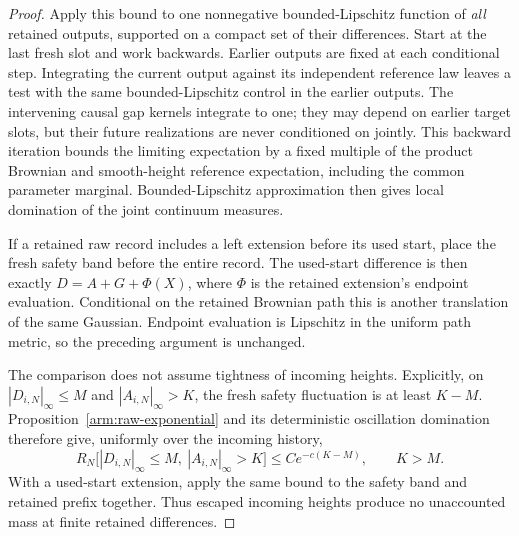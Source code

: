 \begin{proof}
Apply this bound to one nonnegative bounded-Lipschitz function of
\emph{all} retained outputs, supported on a compact set of their
differences.  Start at the last fresh slot and work backwards.
Earlier outputs are fixed at each conditional step.  Integrating the
current output against its independent reference law leaves a test
with the same bounded-Lipschitz control in the earlier outputs.
The intervening causal gap kernels integrate to one; they may depend
on earlier target slots, but their future realizations are never
conditioned on jointly.  This backward iteration bounds the limiting
expectation by a fixed multiple of the product Brownian and
smooth-height reference expectation, including the common parameter
marginal.  Bounded-Lipschitz approximation then gives local domination
of the joint continuum measures.

If a retained raw record includes a left extension before its used
start, place the fresh safety band before the entire record.  The
used-start difference is then exactly
$D=A+G+\Phi(X)$, where $\Phi$ is the retained extension's endpoint
evaluation.  Conditional on the retained Brownian path this is another
translation of the same Gaussian.  Endpoint evaluation is Lipschitz
in the uniform path metric, so the preceding argument is unchanged.

The comparison does not assume tightness of incoming heights.
Explicitly, on $|D_{i,N}|_\infty\le M$ and
$|A_{i,N}|_\infty>K$, the fresh safety fluctuation is at least $K-M$.
Proposition~\ref{arm:raw-exponential} and its deterministic oscillation
domination therefore give, uniformly over the incoming history,
\[
 R_N\bigl[|D_{i,N}|_\infty\le M,\
              |A_{i,N}|_\infty>K\bigr]
 \le C e^{-c(K-M)},\qquad K>M.
\]
With a used-start extension, apply the same bound to the safety band
and retained prefix together.  Thus escaped incoming heights produce
no unaccounted mass at finite retained differences.


\end{proof}
